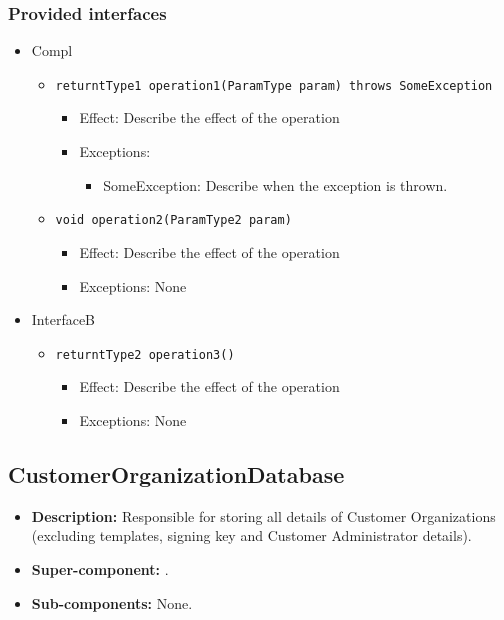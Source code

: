 \subsubsection*{Provided interfaces}
\begin{itemize}
    \item Compl
    \begin{itemize}
        \item \texttt{returntType1 operation1(ParamType param) throws SomeException}
        \begin{itemize}
            \item Effect: Describe the effect of the operation
            \item Exceptions:
            \begin{itemize}
                \item SomeException: Describe when the exception is thrown.
            \end{itemize}
        \end{itemize}

        \item \texttt{void operation2(ParamType2 param)}
		    \begin{itemize}
                \item Effect: Describe the effect of the operation
                \item Exceptions: None
            \end{itemize}
    \end{itemize}

    \item InterfaceB
    \begin{itemize}
        \item \texttt{returntType2 operation3()}
        \begin{itemize}
            \item Effect: Describe the effect of the operation
            \item Exceptions: None
        \end{itemize}
    \end{itemize}
\end{itemize}

\subsection{CustomerOrganizationDatabase}
\begin{itemize}
    \item \textbf{Description:} Responsible for storing all details of Customer Organizations (excluding templates, signing key and Customer Administrator details).
    \item \textbf{Super-component:} .
    \item \textbf{Sub-components:} None.
\end{itemize}

